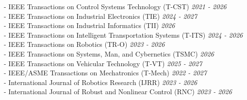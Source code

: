 \documentclass[letterpaper,10pt]{article}
\begin{document}
\hspace*{0.5cm} - IEEE Transactions on Control Systems Technology (T-CST) \hfill \emph{2021 - 2026} \\
\hspace*{0.5cm} - IEEE Transactions on Industrial Electronics (TIE) \hfill \emph{2024 - 2027} \\
\hspace*{0.5cm} - IEEE Transactions on Industrial Informatics (TII) \hfill \emph{2026} \\
\hspace*{0.5cm} - IEEE Transactions on Intelligent Transportation Systems (T-ITS) \hfill \emph{2024 - 2026} \\
\hspace*{0.5cm} - IEEE Transactions on Robotics (TR-O) \hfill \emph{2023 - 2026} \\
\hspace*{0.5cm} - IEEE Transactions on Systems, Man, and Cybernetics (TSMC) \hfill \emph{2026} \\
\hspace*{0.5cm} - IEEE Transactions on Vehicular Technology (T-VT) \hfill \emph{2025 - 2027} \\
\hspace*{0.5cm} - IEEE/ASME Transactions on Mechatronics (T-Mech) \hfill \emph{2022 - 2027} \\
\hspace*{0.5cm} - International Journal of Robotics Research (IJRR) \hfill \emph{2023 - 2026} \\
\hspace*{0.5cm} - International Journal of Robust and Nonlinear Control (RNC) \hfill \emph{2023 - 2026} \\
\end{document}

